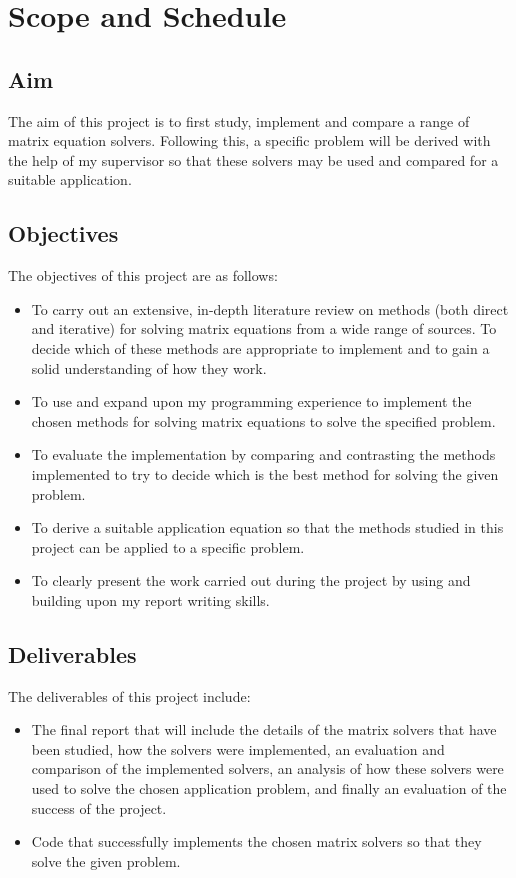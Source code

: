 \documentclass{article}
\numberwithin{equation}{section}
\begin{document}
\newpage

\section{Scope and Schedule}
\subsection{Aim}
The aim of this project is to first study, implement and compare a range of matrix equation solvers. Following this, a specific problem will be derived with the help of my supervisor so that these solvers may be used and compared for a suitable application.

\subsection{Objectives}
The objectives of this project are as follows:
\begin{itemize}
\item To carry out an extensive, in-depth literature review on methods (both direct and iterative) for solving matrix equations from a wide range of sources. To decide which of these methods are appropriate to implement and to gain a solid understanding of how they work. 
\item To use and expand upon my programming experience to implement the chosen methods for solving matrix equations to solve the specified problem. 
\item To evaluate the implementation by comparing and contrasting the methods implemented to try to decide which is the best method for solving the given problem.
\item To derive a suitable application equation so that the methods studied in this project can be applied to a specific problem. 
\item To clearly present the work carried out during the project by using and building upon my report writing skills.
\end{itemize}

\subsection{Deliverables}
The deliverables of this project include:
\begin{itemize}
\item The final report that will include the details of the matrix solvers that have been studied, how the solvers were implemented, an evaluation and comparison of the implemented solvers, an analysis of how these solvers were used to solve the chosen application problem, and finally an evaluation of the success of the project.  
\item Code that successfully implements the chosen matrix solvers so that they solve the given problem.
\end{itemize}
\end{document}

